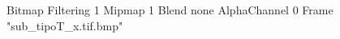 {Bitmap
	{Filtering 1}
	{Mipmap 1}
	{Blend none}
	{AlphaChannel 0}
	{Frame "sub_tipoT_x.tif.bmp"}
}
